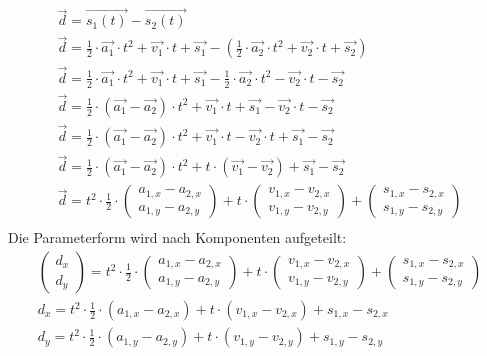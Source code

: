 \begin{align}
    \vec{d} = \vec{s_1(t)} - \vec{s_2(t)}\\
    \vec{d} = \frac{1}{2} \cdot \vec{a_1} \cdot t^2 + \vec{v_{1}} \cdot t + \vec{s_{1}} - (\frac{1}{2} \cdot \vec{a_2} \cdot t^2 + \vec{v_{2}} \cdot t + \vec{s_{2}})\\
    \vec{d} = \frac{1}{2} \cdot \vec{a_1} \cdot t^2 + \vec{v_{1}} \cdot t + \vec{s_{1}} - \frac{1}{2} \cdot \vec{a_2} \cdot t^2 - \vec{v_{2}} \cdot t - \vec{s_{2}}\\
    \vec{d} = \frac{1}{2} \cdot (\vec{a_1} - \vec{a_2}) \cdot t^2 + \vec{v_{1}} \cdot t + \vec{s_{1}} - \vec{v_{2}} \cdot t - \vec{s_{2}}\\
    \vec{d} = \frac{1}{2} \cdot (\vec{a_1} - \vec{a_2}) \cdot t^2 + \vec{v_{1}} \cdot t - \vec{v_{2}} \cdot t + \vec{s_{1}} - \vec{s_{2}}\\
    \vec{d} = \frac{1}{2} \cdot (\vec{a_1} - \vec{a_2}) \cdot t^2 + t \cdot (\vec{v_{1}} - \vec{v_{2}}) + \vec{s_{1}} - \vec{s_{2}}\\
    \vec{d} = t^2 \cdot \frac{1}{2} \cdot \begin{pmatrix}a_{1,x} - a_{2,x}\\a_{1,y} - a_{2,y}\end{pmatrix} + t \cdot \begin{pmatrix}v_{1,x} - v_{2,x}\\v_{1,y} - v_{2,y}\end{pmatrix} + \begin{pmatrix}s_{1,x} - s_{2,x}\\s_{1,y} - s_{2,y}\end{pmatrix}\\
\end{align}
Die Parameterform wird nach Komponenten aufgeteilt:
\begin{align}
    \begin{pmatrix}d_{x}\\d_{y}\end{pmatrix} = t^2 \cdot \frac{1}{2} \cdot \begin{pmatrix}a_{1,x} - a_{2,x}\\a_{1,y} - a_{2,y}\end{pmatrix} + t \cdot \begin{pmatrix}v_{1,x} - v_{2,x}\\v_{1,y} - v_{2,y}\end{pmatrix} + \begin{pmatrix}s_{1,x} - s_{2,x}\\s_{1,y} - s_{2,y}\end{pmatrix}\\
    d_x = t^2 \cdot \frac{1}{2} \cdot (a_{1,x} - a_{2,x}) + t \cdot (v_{1,x} - v_{2,x}) + s_{1,x} - s_{2,x}\\
    d_y = t^2 \cdot \frac{1}{2} \cdot (a_{1,y} - a_{2,y}) + t \cdot (v_{1,y} - v_{2,y}) + s_{1,y} - s_{2,y}
\end{align}
